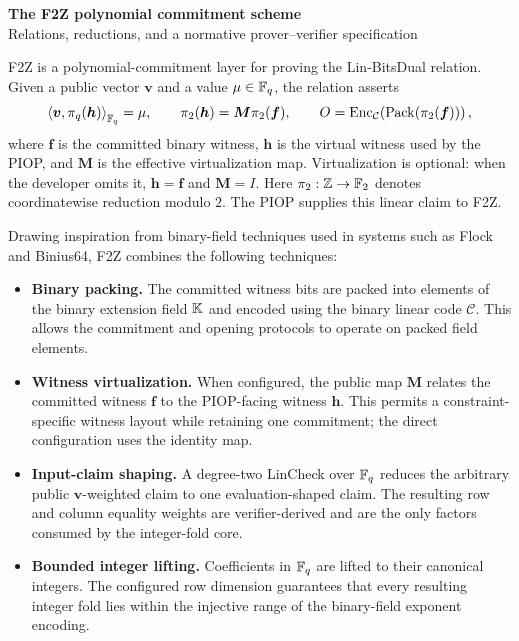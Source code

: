 \documentclass[9pt,letterpaper]{extarticle}
\newenvironment{normative}
  {\par\smallskip\begingroup
   \setlength{\leftskip}{0.7em}\setlength{\rightskip}{0.7em}%
   }
  {\par\endgroup\smallskip}
\begin{document}
\clgreset

\begin{center}
  {\Large\bfseries\color{specnavy}The F2Z polynomial commitment scheme}\\[2pt]
  {\small Relations, reductions, and a normative prover--verifier specification}
\end{center}

\begin{normative}
F2Z is a polynomial-commitment layer for proving the Lin-BitsDual relation.
Given a public vector $\bm v$ and a value $\mu\in\mathbb F_q$, the relation asserts
\[
  \left\langle\bm v,\pi_q(\bm h)\right\rangle_{\mathbb F_q}=\mu,
  \qquad
  \pi_2(\bm h)=\bm M\pi_2(\bm f),
  \qquad
  O=\operatorname{Enc}_{\mathcal C}\!\left(\operatorname{Pack}(\pi_2(\bm f))\right),
\]
where $\bm f$ is the committed binary witness, $\bm h$ is the virtual witness
used by the PIOP, and $\bm M$ is the effective virtualization map.
Virtualization is optional: when the developer omits it, $\bm h=\bm f$ and
$\bm M=I$.
Here $\pi_2:\mathbb Z\to\mathbb F_2$ denotes coordinatewise reduction modulo $2$.
The PIOP supplies this linear claim to F2Z.

Drawing inspiration from binary-field techniques used in systems such as Flock and Binius64, F2Z combines the following techniques:

\begin{itemize}[leftmargin=1.4em]
 \item \textbf{Binary packing.}
       The committed witness bits are packed into elements of the binary
       extension field $\mathbb K$ and encoded using the binary linear code
       $\mathcal C$. This allows the commitment and opening protocols to
       operate on packed field elements.

 \item \textbf{Witness virtualization.}
       When configured, the public map $\bm M$ relates the committed witness
       $\bm f$ to the PIOP-facing witness $\bm h$. This permits a
       constraint-specific witness layout while retaining one commitment;
       the direct configuration uses the identity map.

 \item \textbf{Input-claim shaping.}
       A degree-two LinCheck over $\mathbb F_q$ reduces the arbitrary public
       $\bm v$-weighted claim to one evaluation-shaped claim.  The resulting
       row and column equality weights are verifier-derived and are the only
       factors consumed by the integer-fold core.

 \item \textbf{Bounded integer lifting.}
       Coefficients in $\mathbb F_q$ are lifted to their canonical integers.  The
       configured row dimension guarantees that every resulting integer fold
       lies within the injective range of the binary-field exponent encoding.


\end{itemize}
\end{normative}
\end{document}
